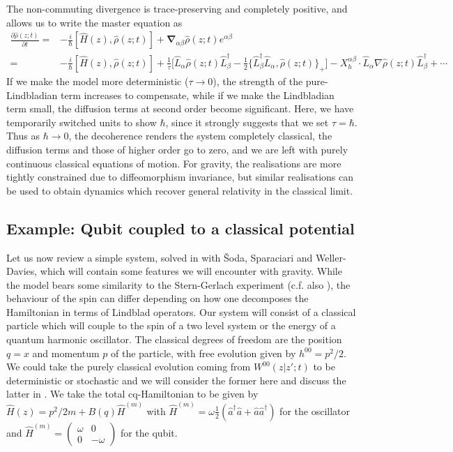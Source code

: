 \documentclass[aps,pra,showpacs,citeautoscript,amsmath,amssymb,floatfix,superscriptaddress,bbm, verbatim,amsfonts,changes,12pt,nofootinbib,longbibliography]{revtex4-2}
\def\z{{z}}
\def\L{{\hat{L}}}
\def\Hq{\hat{H}}
\def\Hqm{\hat{H}^{(m)}}
\def\baseab{e^{\alpha\beta}}
\def\PQdiv{\boldsymbol{\nabla}_{\alpha\beta}}
\def\rate{{W}}
\def\ab{^{\alpha\beta}}
\renewcommand{\varrho}{\hat{\rho}}
\def\psiz{{\varrho(\z;t)}}
\def\bfa{\hat{a}}
\begin{document}
The non-commuting divergence is trace-preserving and completely positive, and allows us to write the master equation as
\begin{align}
\frac{\partial\psiz}{\partial t}=
  &-\frac{i}{\hbar}[\Hq(\z),\psiz]
+\PQdiv\psiz\baseab
  \nonumber\\
  =& -\frac{i}{\hbar}[\Hq(\z),\psiz]
  +\frac{1}{\tau}
  \Big[
\L_\alpha\psiz\L^\dagger_\beta
-
\frac{1}{2}\{ \L^\dagger_\beta\L_\alpha,\psiz  \}_+
\Big]
 -X_h\ab\cdot\L_\alpha \nabla\psiz\L_\beta^\dagger
  +\cdots
\label{eq:simplemaster}
\end{align}
If we make the model more deterministic ($\tau\rightarrow 0$), the strength of the pure-Lindbladian term increases to compensate, while if we make the Lindbladian term small, the diffusion terms at second order become significant. Here, we have temporarily switched units to show $\hbar$, since it strongly suggests that we set $\tau=\hbar$. Thus as $\hbar\rightarrow 0$, the decoherence renders the system completely classical, the diffusion terms and those of higher order go to zero, and we are left with purely continuous classical equations of motion. For gravity, the realisations are more 
tightly constrained due to diffeomorphism invariance, but similar realisations can be used to obtain dynamics which recover general relativity in the classical limit. 


\subsection{Example: Qubit coupled to a classical potential}
\label{sec:qubit}

Let us now review a simple system, solved in \cite{UCLqubit} with Šoda, Sparaciari and Weller-Davies, which will contain some features we will encounter with gravity\cite{carlo_foot}.  While the model bears some similarity to the Stern-Gerlach experiment (c.f. also \cite{diosi2000quantum}), the behaviour of the spin can differ depending on how one decomposes the Hamiltonian in terms of Lindblad operators. 
Our system will consist of a classical particle which will couple to the spin of a two level system or the energy of a quantum harmonic oscillator. The classical degrees of freedom are the position $q=x$ and momentum $p$ of the particle, with free evolution given by $h^{00}=p^2/2$. We could take the purely classical evolution \label{par:pureclassical}coming from $\rate^{00}(\z|\z';t)$ to be deterministic or stochastic and we will consider the former here and discuss the latter in \cite{UCLqubit}.  We take the total cq-Hamiltonian to
be given by $\Hq(\z)=p^2/2m+B(q)\Hqm$ with $\Hqm=\omega \frac{1}{2}({\bfa}^\dagger{\bfa}+{\bfa}{\bfa}^\dagger)$ for the oscillator and 
$\Hqm=
\begin{pmatrix} \omega & 0\\ 0 & -\omega\end{pmatrix}$ for the qubit.
\end{document}
